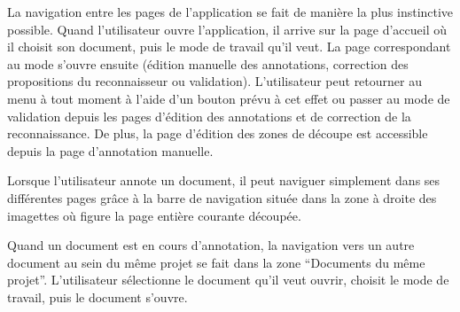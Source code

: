 La navigation entre les pages de l’application se fait de manière la plus 
instinctive possible. Quand l’utilisateur ouvre l’application, il arrive 
sur la page d’accueil où il choisit son document, puis le mode de travail
 qu’il veut. La page correspondant au mode s’ouvre ensuite (édition manuelle 
des annotations, correction des propositions du reconnaisseur ou validation).
 L’utilisateur peut retourner au menu à tout moment à l’aide d’un bouton
 prévu à cet effet ou passer au mode de validation depuis les pages 
d’édition des annotations et de correction de la reconnaissance. De plus, 
la page d’édition des zones de découpe est accessible depuis la page 
d’annotation manuelle.

Lorsque l’utilisateur annote un document, il peut naviguer simplement 
dans ses différentes pages grâce à la barre de navigation située dans 
la zone à droite des imagettes où figure la page entière courante découpée.

Quand un document est en cours d’annotation, la navigation vers un autre 
document au sein du même projet se fait dans la zone “Documents du même 
projet”. L’utilisateur sélectionne le document qu’il veut ouvrir, 
choisit le mode de travail, puis le document s’ouvre.



